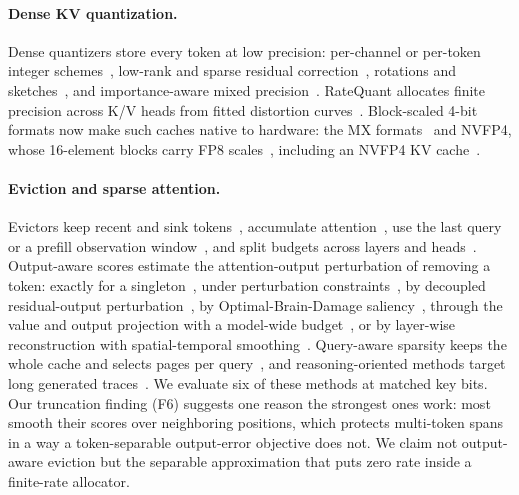\documentclass{article}
\theoremstyle{definition}
\begin{document}
\paragraph{Dense KV quantization.}
Dense quantizers store every token at low precision: per-channel or per-token integer schemes~\citep{liu2024kivi,hooper2024kvquant}, low-rank and sparse residual correction~\citep{kang2024gear}, rotations and sketches~\citep{zandieh2024qjl,zandieh2025turboquant}, and importance-aware mixed precision~\citep{yang2024mikv,he2024zipcache}.  RateQuant allocates finite precision across K/V heads from fitted distortion curves~\citep{zuo2026ratequant}.  
Block-scaled 4-bit formats now make such caches native to hardware: the MX formats~\citep{ocp2023mx} and NVFP4, whose 16-element blocks carry FP8 scales~\citep{alvarez2025nvfp4}, including an NVFP4 KV cache~\citep{alvarez2025nvfp4kv}.

\paragraph{Eviction and sparse attention.}
Evictors keep recent and sink tokens~\citep{xiao2024streamingllm}, accumulate attention~\citep{zhang2023h2o,liu2023scissorhands}, use the last query~\citep{oren2024tova} or a prefill observation window~\citep{li2024snapkv}, and split budgets across layers and heads~\citep{cai2024pyramidkv,feng2024adakv}.  
Output-aware scores estimate the attention-output perturbation of removing a token: exactly for a singleton~\citep{goel2025caote}, under perturbation constraints~\citep{feng2026criticalkv}, by decoupled residual-output perturbation~\citep{zhang2026dropkv}, by Optimal-Brain-Damage saliency~\citep{gu2026obcache}, through the value and output projection with a model-wide budget~\citep{mai2026laprox}, or by layer-wise reconstruction with spatial-temporal smoothing~\citep{an2026restkv}. 
 Query-aware sparsity keeps the whole cache and selects pages per query~\citep{tang2024quest}, and reasoning-oriented methods target long generated traces~\citep{cai2025rkv,mao2026triattention}.  
We evaluate six of these methods at matched key bits.  
Our truncation finding (F6) suggests one reason the strongest ones work: most smooth their scores over neighboring positions, which protects multi-token spans in a way a token-separable output-error objective does not.  
We claim not output-aware eviction but the separable approximation that puts zero rate inside a finite-rate allocator.
\end{document}
